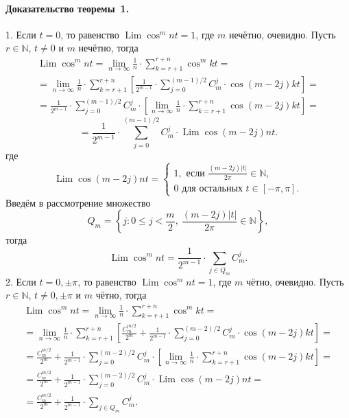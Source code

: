 \paragraph{Доказательство теоремы~1.}
1. Если $t = 0$, то равенство $\operatorname{Lim} \cos^m nt = 1$, 
где $m$ нечётно, очевидно. Пусть $r \in \mathbb N$, $t \neq 0$ и $m$ нечётно, тогда \\[-4mm]
\begin{multline*}
	\operatorname{Lim} \cos^m nt = \lim_{n \to \infty} \frac 1n \cdot
	\sum_{k = r + 1}^{r + n} \cos^m kt = \\
	= \lim_{n \to \infty} \frac 1n \cdot \sum_{k = r + 1}^{r + n}
	\left[\frac 1{2^{m - 1}} \cdot \sum_{j = 0}^{(m - 1)/2} C^j_m \cdot 
	\cos (m - 2j) kt\right] = \\
	= \frac 1{2^{m - 1}} \cdot \sum_{j = 0}^{(m - 1)/2} C^j_m \cdot 
	\left[\lim_{n \to \infty} \frac 1n \cdot 
	\sum_{k = r + 1}^{r + n} \cos (m - 2j) kt\right] = 
\end{multline*}
\begin{equation*}
	= \frac 1{2^{m - 1}} \cdot \sum_{j = 0}^{(m - 1)/2}
	C^j_m \cdot \operatorname{Lim} \cos (m - 2j) nt. 
\end{equation*}
где \\[-4mm]
$$
\operatorname{Lim} \cos (m - 2j) nt = \left\{
\begin{array}{l}
	1, \mbox{ если } {\displaystyle \frac{(m - 2j) |t|}{2\pi}} \in \mathbb N, \\[3mm]
	0 \mbox{ для остальных } t \in [-\pi, \pi].
\end{array}
\right.  
$$
Введём в рассмотрение множество
$$
Q_m = \left\{j: 0 \leqslant j < \frac m2, \ \frac{(m - 2j) |t|}{2\pi} \in \mathbb N\right\},
$$
тогда
$$
\operatorname{Lim} \cos^m nt = \frac 1{2^{m - 1}} \cdot \sum_{j \in Q_m} C^j_m. 
$$
2. Если $t = 0, \pm\pi$, то равенство $\operatorname{Lim} \cos^m nt = 1$, 
где $m$ чётно, очевидно. Пусть $r \in \mathbb N$, $t \neq 0, \pm\pi$ и $m$ чётно, тогда \\[-4mm]
\begin{multline*}
	\operatorname{Lim} \cos^m nt = \lim_{n \to \infty} \frac 1n \cdot
	\sum_{k = r + 1}^{r + n} \cos^m kt = \\
	= \lim_{n \to \infty} \frac 1n \cdot \sum_{k = r + 1}^{r + n} 
	\left[\frac{C^{m/2}_m}{2^m} + \frac 1{2^{m - 1}} \cdot 
	\sum_{j = 0}^{(m - 2)/2} C^j_m \cdot \cos (m - 2j) kt\right] = \\
	= \frac{C^{m/2}_m}{2^m} + \frac 1{2^{m - 1}} \cdot 
	\sum_{j = 0}^{(m - 2)/2} C^j_m \cdot
	\left[\lim_{n \to \infty} \frac 1n \cdot \sum_{k = r + 1}^{r + n}
	\cos (m - 2j) kt\right] = \\
	= \frac{C^{m/2}_m}{2^m} + \frac 1{2^{m - 1}} \cdot 
	\sum_{j = 0}^{(m - 2)/2} C^j_m \cdot
	\operatorname{Lim} \cos (m - 2j) nt = \\
	= \frac{C^{m/2}_m}{2^m} + \frac 1{2^{m - 1}} \cdot \sum_{j \in Q_m} C^j_m. 
\end{multline*}


